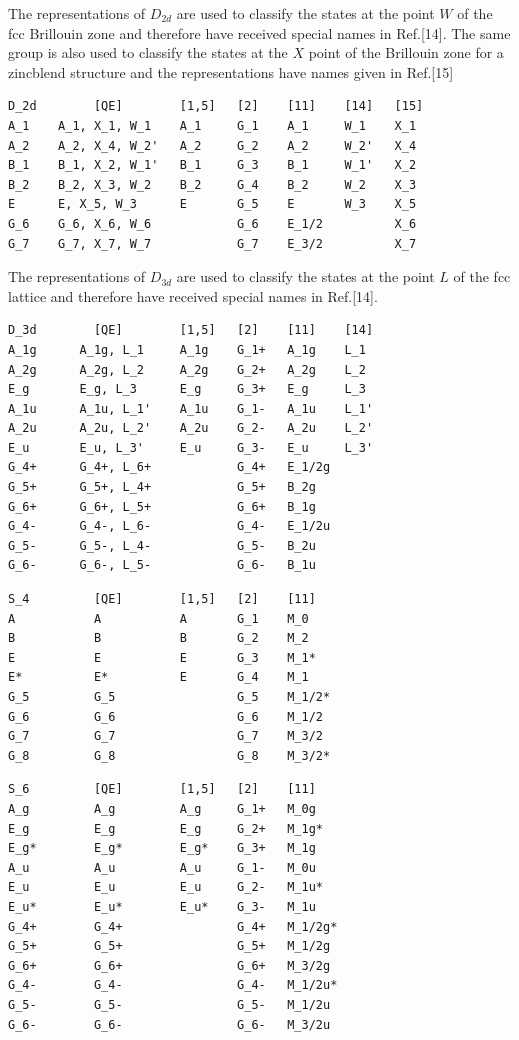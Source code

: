 \documentclass[12pt,a4paper]{article}
\begin{document}
The representations of $D_{2d}$ are used to classify the states at the
point $W$ of the fcc Brillouin zone and therefore have received special names 
in Ref.[14]. The same group is also used to classify the states at the
$X$ point of the Brillouin zone for a zincblend structure and the
representations have names given in Ref.[15]
\begin{verbatim}
D_2d        [QE]        [1,5]   [2]    [11]    [14]   [15]
A_1    A_1, X_1, W_1    A_1     G_1    A_1     W_1    X_1
A_2    A_2, X_4, W_2'   A_2     G_2    A_2     W_2'   X_4
B_1    B_1, X_2, W_1'   B_1     G_3    B_1     W_1'   X_2
B_2    B_2, X_3, W_2    B_2     G_4    B_2     W_2    X_3
E      E, X_5, W_3      E       G_5    E       W_3    X_5
G_6    G_6, X_6, W_6            G_6    E_1/2          X_6
G_7    G_7, X_7, W_7            G_7    E_3/2          X_7
\end{verbatim}

The representations of $D_{3d}$ are used to classify the states at the
point $L$ of the fcc lattice and therefore have received special names 
in Ref.[14].
\begin{verbatim}
D_3d        [QE]        [1,5]   [2]    [11]    [14]
A_1g      A_1g, L_1     A_1g    G_1+   A_1g    L_1
A_2g      A_2g, L_2     A_2g    G_2+   A_2g    L_2
E_g       E_g, L_3      E_g     G_3+   E_g     L_3
A_1u      A_1u, L_1'    A_1u    G_1-   A_1u    L_1'   
A_2u      A_2u, L_2'    A_2u    G_2-   A_2u    L_2'
E_u       E_u, L_3'     E_u     G_3-   E_u     L_3'
G_4+      G_4+, L_6+            G_4+   E_1/2g
G_5+      G_5+, L_4+            G_5+   B_2g
G_6+      G_6+, L_5+            G_6+   B_1g
G_4-      G_4-, L_6-            G_4-   E_1/2u
G_5-      G_5-, L_4-            G_5-   B_2u
G_6-      G_6-, L_5-            G_6-   B_1u
\end{verbatim}

\begin{verbatim}
S_4         [QE]        [1,5]   [2]    [11]
A           A           A       G_1    M_0
B           B           B       G_2    M_2
E           E           E       G_3    M_1*
E*          E*          E       G_4    M_1
G_5         G_5                 G_5    M_1/2*
G_6         G_6                 G_6    M_1/2
G_7         G_7                 G_7    M_3/2
G_8         G_8                 G_8    M_3/2*
\end{verbatim}

\begin{verbatim}
S_6         [QE]        [1,5]   [2]    [11]
A_g         A_g         A_g     G_1+   M_0g
E_g         E_g         E_g     G_2+   M_1g*
E_g*        E_g*        E_g*    G_3+   M_1g
A_u         A_u         A_u     G_1-   M_0u
E_u         E_u         E_u     G_2-   M_1u*
E_u*        E_u*        E_u*    G_3-   M_1u
G_4+        G_4+                G_4+   M_1/2g*
G_5+        G_5+                G_5+   M_1/2g
G_6+        G_6+                G_6+   M_3/2g
G_4-        G_4-                G_4-   M_1/2u*
G_5-        G_5-                G_5-   M_1/2u
G_6-        G_6-                G_6-   M_3/2u
\end{verbatim}
\end{document}
